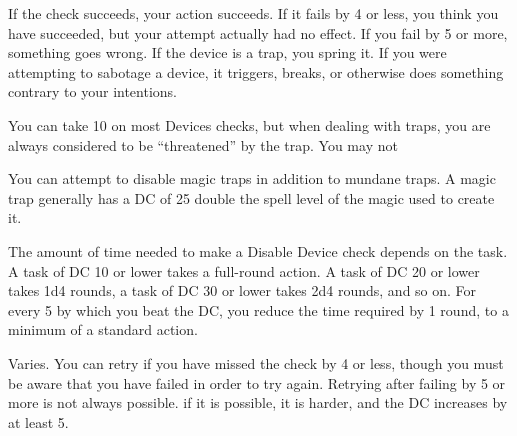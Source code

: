If the check succeeds, your action succeeds. If it fails by 4 or less, you think you have succeeded, but your attempt actually had no effect. If you fail by 5 or more, something goes wrong. If the device is a trap, you spring it. If you were attempting to sabotage a device, it triggers, breaks, or otherwise does something contrary to your intentions.

You can take 10 on most Devices checks, but when dealing with traps, you are always considered to be ``threatened'' by the trap. You may not 

\par You can attempt to disable magic traps in addition to mundane traps. A magic trap generally has a DC of 25 \add double the spell level of the magic used to create it.

 The amount of time needed to make a Disable Device check depends on the task. A task of DC 10 or lower takes a full-round action. A task of DC 20 or lower takes 1d4 rounds, a task of DC 30 or lower takes 2d4 rounds, and so on. For every 5 by which you beat the DC, you reduce the time required by 1 round, to a minimum of a standard action.

 Varies. You can retry if you have missed the check by 4 or less, though you must be aware that you have failed in order to try again. Retrying after failing by 5 or more is not always possible. if it is possible, it is harder, and the DC increases by at least 5.

